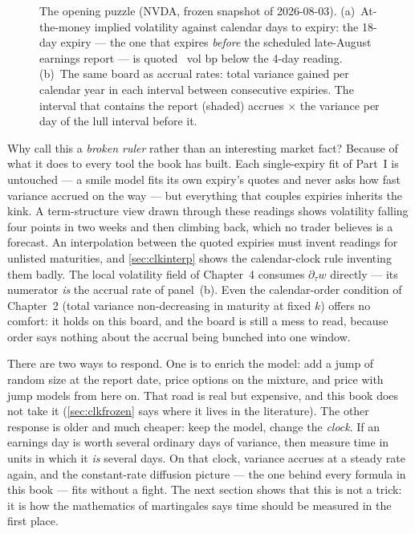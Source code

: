 \begin{figure}[htbp]
\centering
{}
\caption{The opening puzzle (NVDA, frozen snapshot of 2026-08-03).
(a)~At-the-money implied volatility against calendar days to expiry:
the 18-day expiry --- the one that expires \emph{before} the scheduled
late-August earnings report --- is quoted \MacClkBoardDipBp\ vol bp
below the 4-day reading.  (b)~The same board as accrual rates: total
variance gained per calendar year in each interval between consecutive
expiries.  The interval that contains the report (shaded) accrues
\MacClkBoardHotOverLull$\times$ the variance per day of the lull
interval before it.}
\label{fig:clkboard}
\end{figure}

Why call this a \emph{broken ruler} rather than an interesting market
fact?  Because of what it does to every tool the book has built.  Each
single-expiry fit of Part~I is untouched --- a smile model fits its own
expiry's quotes and never asks how fast variance accrued on the way ---
but everything that couples expiries inherits the kink.  A
term-structure view drawn through these readings shows volatility
falling four points in two weeks and then climbing back, which no
trader believes is a forecast.  An interpolation between the quoted
expiries must invent readings for unlisted maturities, and
\cref{sec:clkinterp} shows the calendar-clock rule inventing them
badly.  The local volatility field of Chapter~4 consumes
$\partial_\tau w$ directly --- its numerator \emph{is} the accrual
rate of panel~(b).  Even the calendar-order condition of Chapter~2
(total variance non-decreasing in maturity at fixed $k$) offers no
comfort: it holds on this board, and the board is still a mess to
read, because order says nothing about the accrual being bunched
into one window.

There are two ways to respond.  One is to enrich the model: add a jump
of random size at the report date, price options on the mixture, and
price with jump models from here on.  That road is real
but expensive, and this book does not take it (\cref{sec:clkfrozen}
says where it lives in the literature).  The other response is older
and much cheaper: keep the model, change the \emph{clock}.  If an
earnings day is worth several ordinary days of variance, then measure
time in units in which it \emph{is} several days.  On that clock,
variance accrues at a steady rate again, and the constant-rate
diffusion picture --- the one behind every formula in this book ---
fits without a fight.  The next section shows that this is not a
trick: it is how the mathematics of martingales says time should be
measured in the first place.

